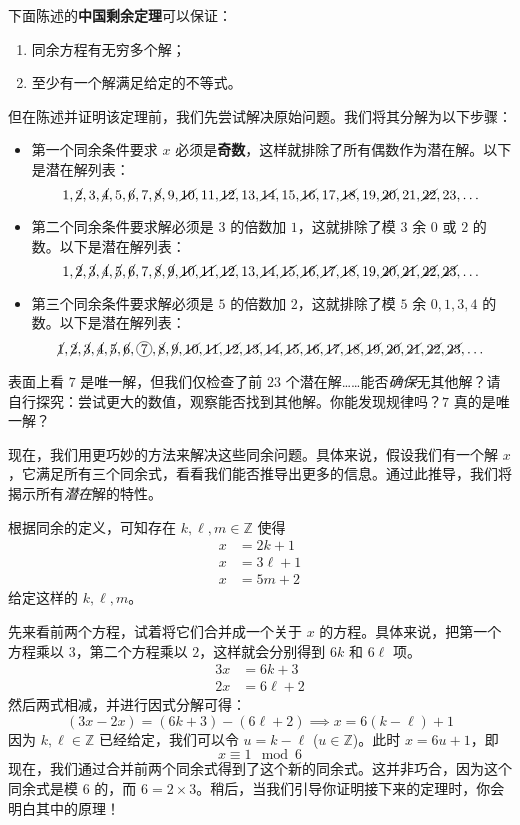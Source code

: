 下面陈述的\textbf{中国剩余定理}可以保证：
\begin{enumerate}[label=(\arabic*)]
    \item 同余方程有无穷多个解；
    \item 至少有一个解满足给定的不等式。
\end{enumerate}
但在陈述并证明该定理前，我们先尝试解决原始问题。我们将其分解为以下步骤：
\begin{itemize}
    \item 第一个同余条件要求 $x$ 必须是\textbf{奇数}，这样就排除了所有偶数作为潜在解。以下是潜在解列表：
    \[1,\cancel{2}, 3, \cancel{4}, 5, \cancel{6}, 7, \cancel{8}, 9,\cancel{10}, 11,\cancel{12}, 13,\cancel{14}, 15,\cancel{16}, 17,\cancel{18}, 19,\cancel{20}, 21,\cancel{22}, 23, \dots\]

    \item 第二个同余条件要求解必须是 $3$ 的倍数加 $1$，这就排除了模 $3$ 余 $0$ 或 $2$ 的数。以下是潜在解列表：
    \[1,\cancel{2}, \cancel{3}, \cancel{4}, \cancel{5}, \cancel{6}, 7, \cancel{8}, \cancel{9},\cancel{10}, \cancel{11},\cancel{12}, 13,\cancel{14}, \cancel{15},\cancel{16}, \cancel{17},\cancel{18}, 19,\cancel{20}, \cancel{21},\cancel{22}, \cancel{23}, \dots\]

    \item 第三个同余条件要求解必须是 $5$ 的倍数加 $2$，这就排除了模 $5$ 余 $0, 1, 3, 4$ 的数。以下是潜在解列表：
    \[\cancel{1},\cancel{2}, \cancel{3}, \cancel{4}, \cancel{5}, \cancel{6}, \circled{7}, \cancel{8}, \cancel{9},\cancel{10}, \cancel{11},\cancel{12}, \cancel{13},\cancel{14}, \cancel{15},\cancel{16}, \cancel{17},\cancel{18}, \cancel{19},\cancel{20}, \cancel{21},\cancel{22}, \cancel{23}, \dots\]
\end{itemize}
表面上看 $7$ 是唯一解，但我们仅检查了前 $23$ 个潜在解……能否\emph{确保}无其他解？请自行探究：尝试更大的数值，观察能否找到其他解。你能发现规律吗？$7$ 真的是唯一解？

现在，我们用更巧妙的方法来解决这些同余问题。具体来说，假设我们有一个解 $x$，它满足所有三个同余式，看看我们能否推导出更多的信息。通过此推导，我们将揭示所有\emph{潜在}解的特性。

根据同余的定义，可知存在 $k, \ell, m \in \mathbb{Z}$ 使得
\begin{align*}
    x &= 2k + 1 \\
    x &= 3\ell + 1 \\
    x &= 5m + 2 
\end{align*}
给定这样的 $k, \ell, m$。

先来看前两个方程，试着将它们合并成一个关于 $x$ 的方程。具体来说，把第一个方程乘以 $3$，第二个方程乘以 $2$，这样就会分别得到 $6k$ 和 $6\ell$ 项。
\begin{align*}
    3x &= 6k + 3 \\
    2x &= 6\ell + 2
\end{align*}
然后两式相减，并进行因式分解可得：
\[(3x - 2x) = (6k + 3) - (6\ell + 2) \implies x = 6(k - \ell) + 1\]
因为 $k, \ell \in \mathbb{Z}$ 已经给定，我们可以令 $u = k-\ell$ ($u \in \mathbb{Z}$)。此时 $x = 6u+1$，即
\[x \equiv 1 \mod 6\]
现在，我们通过合并前两个同余式得到了这个新的同余式。这并非巧合，因为这个同余式是模 $6$ 的，而 $6 = 2 \times 3$。稍后，当我们引导你证明接下来的定理时，你会明白其中的原理！

